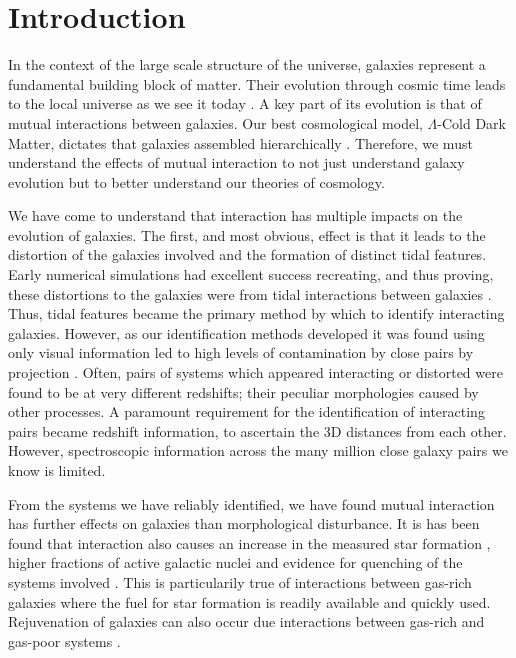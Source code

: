 \chapter{Introduction}\label{chapter:introduction}
In the context of the large scale structure of the universe, galaxies represent a fundamental building block of matter. Their evolution through cosmic time leads to the local universe as we see it today \citep{2005Natur.435..629S}. A key part of its evolution is that of mutual interactions between galaxies. Our best cosmological model, $\Lambda$-Cold Dark Matter, dictates that galaxies assembled hierarchically \citep{1978MNRAS.183..341W, 1991ApJ...379...52W}. Therefore, we must understand the effects of mutual interaction to not just understand galaxy evolution but to better understand our theories of cosmology.

We have come to understand that interaction has multiple impacts on the evolution of galaxies. The first, and most obvious, effect is that it leads to the distortion of the galaxies involved and the formation of distinct tidal features. Early numerical simulations had excellent success recreating, and thus proving, these distortions to the galaxies were from tidal interactions between galaxies \citep{1972ApJ...178..623T}. Thus, tidal features became the primary method by which to identify interacting galaxies. However, as our identification methods developed it was found using only visual information led to high levels of contamination by close pairs by projection \citep[e.g][]{2018MNRAS.479..415A, 2020MNRAS.492.2075B, 2022A&A...661A..52P}. Often, pairs of systems which appeared interacting or distorted were found to be at very different redshifts; their peculiar morphologies caused by other processes. A paramount requirement for the identification of interacting pairs became redshift information, to ascertain the 3D distances from each other. However, spectroscopic information across the many million close galaxy pairs we know is limited.

From the systems we have reliably identified, we have found mutual interaction has further effects on galaxies than morphological disturbance. It is has been found that interaction also causes an increase in the measured star formation \citep{1987ApJ...320...49B, 1992ApJ...400..153M}, higher fractions of active galactic nuclei \citep{2008AJ....135.1877E, 2014MNRAS.441.1297S} and evidence for quenching of the systems involved \citep{1992AJ....104.1039S, 2010MNRAS.407..749G}. This is particularily true of interactions between gas-rich galaxies where the fuel for star formation is readily available and quickly used. Rejuvenation of galaxies can also occur due interactions between gas-rich and gas-poor systems \citep{1992AJ....104.1039S, 2009ApJ...691.1168H}.

